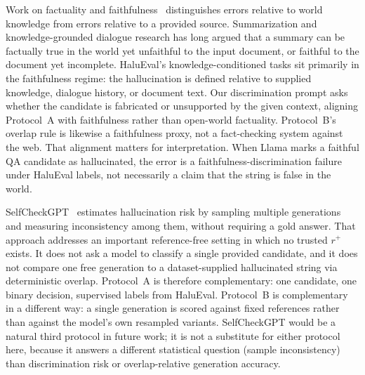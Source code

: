 \documentclass[11pt]{article}
\begin{document}
Work on factuality and faithfulness~\cite{faithfulness-taxonomy} distinguishes
errors relative to world knowledge from errors relative to a provided source.
Summarization and knowledge-grounded dialogue research has long argued that a
summary can be factually true in the world yet unfaithful to the input document,
or faithful to the document yet incomplete. HaluEval's knowledge-conditioned
tasks sit primarily in the faithfulness regime: the hallucination is defined
relative to supplied knowledge, dialogue history, or document text. Our
discrimination prompt asks whether the candidate is fabricated or unsupported by
the given context, aligning Protocol~A with faithfulness rather than open-world
factuality. Protocol~B's overlap rule is likewise a faithfulness proxy, not a
fact-checking system against the web. That alignment matters for interpretation.
When Llama marks a faithful QA candidate as hallucinated, the error is a
faithfulness-discrimination failure under HaluEval labels, not necessarily a
claim that the string is false in the world.

SelfCheckGPT~\cite{selfcheckgpt} estimates hallucination risk by sampling
multiple generations and measuring inconsistency among them, without requiring a
gold answer. That approach addresses an important reference-free setting in which
no trusted $r^+$ exists. It does not ask a model to classify a single provided
candidate, and it does not compare one free generation to a dataset-supplied
hallucinated string via deterministic overlap. Protocol~A is therefore
complementary: one candidate, one binary decision, supervised labels from
HaluEval. Protocol~B is complementary in a different way: a single generation is
scored against fixed references rather than against the model's own resampled
variants. SelfCheckGPT would be a natural third protocol in future work; it is
not a substitute for either protocol here, because it answers a different
statistical question (sample inconsistency) than discrimination risk or
overlap-relative generation accuracy.
\end{document}
